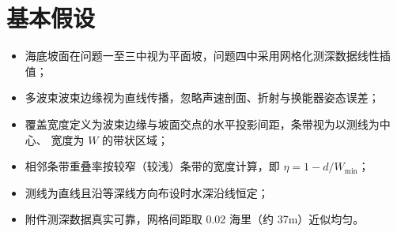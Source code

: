 \documentclass[withoutpreface,bwprint]{cumcmthesis} %
\begin{document}
\section{基本假设}

\begin{itemize}
    \item 海底坡面在问题一至三中视为平面坡，问题四中采用网格化测深数据线性插值；
    \item 多波束波束边缘视为直线传播，忽略声速剖面、折射与换能器姿态误差；
    \item 覆盖宽度定义为波束边缘与坡面交点的水平投影间距，条带视为以测线为中心、
      宽度为 $W$ 的带状区域；
    \item 相邻条带重叠率按较窄（较浅）条带的宽度计算，即 $\eta=1-d/W_{\min}$；
    \item 测线为直线且沿等深线方向布设时水深沿线恒定；
    \item 附件测深数据真实可靠，网格间距取 0.02 海里（约 37m）近似均匀。
\end{itemize}


\newpage
\end{document}

